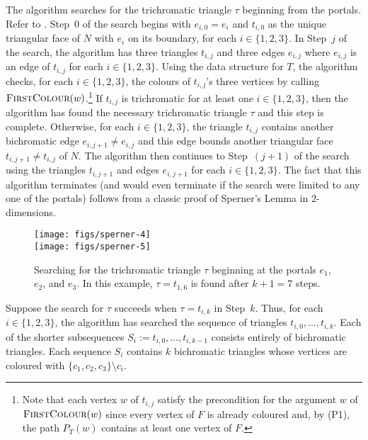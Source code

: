 \documentclass[kpfonts]{patmorin}
\begin{document}
 The algorithm searches for the trichromatic triangle $\tau$ beginning from the portals.  Refer to . Step~0 of the search begins with $e_{i,0}=e_i$ and $t_{i,0}$ as the unique triangular face of $N$ with $e_i$ on its boundary, for each $i\in\{1,2,3\}$. In Step~$j$ of the search, the algorithm has three triangles $t_{i,j}$ and three edges $e_{i,j}$ where $e_{i,j}$ is an edge of $t_{i,j}$ for each $i\in\{1,2,3\}$.  Using the data structure for $T$, the algorithm checks, for each $i\in\{1,2,3\}$, the colours of $t_{i,j}$'s three vertices by calling $\textsc{FirstColour}(w)$.\footnote{Note that each vertex $w$ of $t_{i,j}$ satisfy the precondition for the argument $w$ of $\textsc{FirstColour}(w)$ since every vertex of $F$ is already coloured and, by (P1), the path $P_{T}(w)$ contains at least one vertex of $F$.}  If $t_{i,j}$ is trichromatic for at least one $i\in\{1,2,3\}$, then the algorithm has found the necessary trichromatic triangle $\tau$ and this step is complete. Otherwise, for each $i\in\{1,2,3\}$, the triangle $t_{i,j}$ contains another bichromatic edge $e_{i,j+1}\neq e_{i,j}$ and this edge bounds another triangular face $t_{i,j+1}\neq t_{i,j}$ of $N$.  The algorithm then continues to Step~$(j+1)$ of the search using the triangles $t_{i,j+1}$ and edges $e_{i,j+1}$ for each $i\in\{1,2,3\}$.  The fact that this algorithm terminates (and would even terminate if the search were limited to any one of the portals) follows from a classic proof of Sperner's Lemma in 2-dimensions.

 \begin{figure}
   \begin{center}
     \texttt{[image: figs/sperner-4]} \\[1ex]
     \texttt{[image: figs/sperner-5]}
   \end{center}
   \caption{Searching for the trichromatic triangle $\tau$ beginning at the portals $e_1$, $e_2$, and $e_3$. In this example, $\tau=t_{1,6}$ is found after $k+1=7$ steps.}
 \end{figure}


Suppose the search for $\tau$ succeeds when $\tau=t_{i,k}$ in Step~$k$.  Thus, for each $i\in\{1,2,3\}$, the algorithm has searched the sequence of triangles $t_{i,0},\ldots,t_{i,k}$.  Each of the shorter subsequences $S_i:=t_{i,0},\ldots,t_{i,k-1}$ consists entirely of bichromatic triangles. Each sequence $S_i$ contains $k$ bichromatic triangles whose vertices are coloured with $\{c_1,c_2,c_3\}\setminus c_i$.
\end{document}
